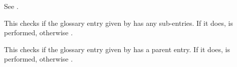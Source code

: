\documentclass[report]{nlctdoc}
\begin{document}
\begin{definition}[\DescribeMacro{\ifglsused}]
\end{definition}
See .

\begin{definition}[\DescribeMacro{\ifglshaschildren}]
\end{definition}
This checks if the glossary entry given by  has any
sub-entries. If it does,  is performed, otherwise
.

\begin{definition}[\DescribeMacro{\ifglshasparent}]
\end{definition}
This checks if the glossary entry given by  has a parent
entry. If it does,  is performed, otherwise
.
\end{document}
